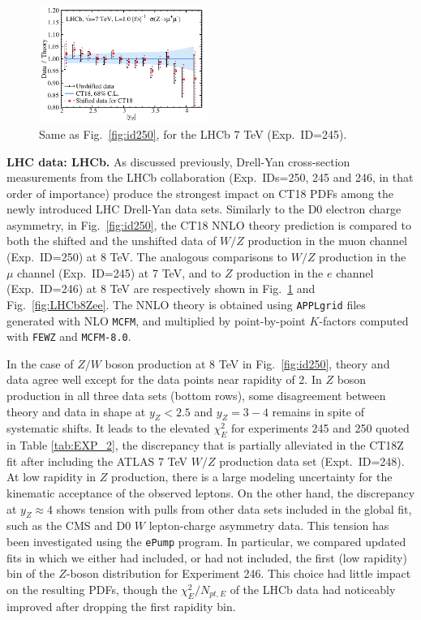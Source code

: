 \begin{figure}[tb]
	\includegraphics[width=0.49\textwidth]{./fig/data_245_CT18__1_DoT_ect.pdf}
	\caption{Same as Fig.~\ref{fig:id250}, for the LHCb 7 TeV (Exp.~ID=245).}
	\label{fig:id245}
\end{figure}


{\bf LHC data: LHCb.}
%
As discussed previously, Drell-Yan cross-section measurements from the LHCb collaboration (Exp.~IDs=250, 245 and 246, 
in that order of importance) produce the strongest impact on CT18 PDFs among the newly introduced LHC Drell-Yan data sets. Similarly to the D0 electron charge asymmetry, in Fig.~\ref{fig:id250}, 
the CT18 NNLO theory prediction is compared to both the shifted and the unshifted data of
$W/Z$ production  in the muon channel (Exp.~ID=250) at 8 TeV. 
The analogous comparisons to $W/Z$ production in the $\mu$ channel (Exp.~ID=245) at 7 TeV, and to $Z$ production in the $e$ channel (Exp.~ID=246) at 8 TeV are respectively shown in Fig.~\ref{fig:id245} and Fig.~\ref{fig:LHCb8Zee}.  
The NNLO theory is obtained using \texttt{APPLgrid} files generated with NLO \texttt{MCFM}, and multiplied by point-by-point $K$-factors computed 
with \texttt{FEWZ} and \texttt{MCFM-8.0}. 

In the case of $Z/W$ boson production at 8 TeV in Fig.~\ref{fig:id250}, 
theory and data agree well except for the data points near rapidity of 2. 
In $Z$ boson production in all three data sets (bottom rows), some disagreement between theory and data in shape at $y_Z <2.5$ and $y_Z=3-4$ remains in spite of systematic shifts. It leads to the  elevated $\chi^2_E$ for experiments 245 and 250 quoted in Table \ref{tab:EXP_2}, the discrepancy that is partially alleviated in the CT18Z fit after including the ATLAS 7 TeV $W/Z$ production data set (Expt.~ID=248).
At low rapidity in $Z$ production, there is a large modeling uncertainty for the kinematic acceptance of the observed leptons. 
On the other hand, the discrepancy at $y_Z\approx 4$ shows tension with pulls from other data sets included in the global fit, 
such as the CMS and D0 $W$ lepton-charge asymmetry data. This tension has been investigated using the \texttt{ePump} program. In particular, we compared updated fits in which we either had included, or had not included, the first (low rapidity) bin of the $Z$-boson distribution for Experiment 246. This choice had little impact on the resulting PDFs, though the $\chi^2_E/N_{pt,E}$ of the LHCb data had noticeably improved after dropping the first rapidity bin. 

